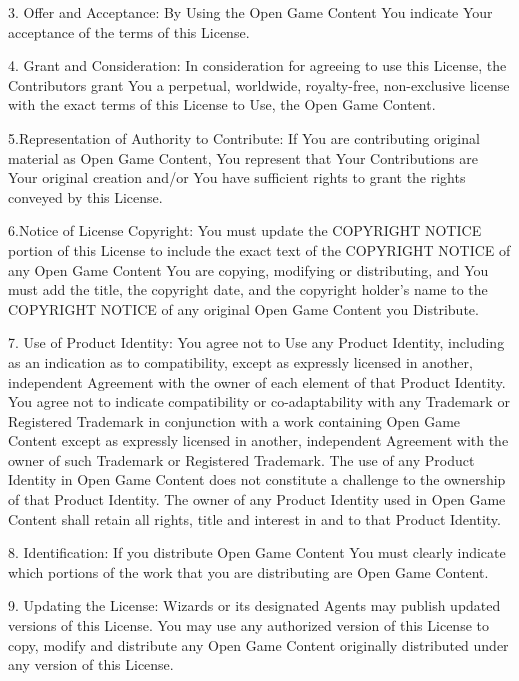 \documentclass[11pt]{article}
\begin{document}
{\bigskip

3. Offer and Acceptance: By Using the Open Game Content You indicate Your acceptance of the terms of this License.

\bigskip

4. Grant and Consideration: In consideration for agreeing to use this License, the Contributors grant You a perpetual, worldwide, royalty-free, non-exclusive license with the exact terms of this License to Use, the Open Game Content.

\bigskip

5.Representation of Authority to Contribute: If You are contributing original material as Open Game Content, You represent that Your Contributions are Your original creation and/or You have sufficient rights to grant the rights conveyed by this License.

\bigskip

6.Notice of License Copyright: You must update the COPYRIGHT NOTICE portion of this License to include the exact text of the COPYRIGHT NOTICE of any Open Game Content You are copying, modifying or distributing, and You must add the title, the copyright date, and the copyright holder's name to the COPYRIGHT NOTICE of any original Open Game Content you Distribute.

\bigskip

7. Use of Product Identity: You agree not to Use any Product Identity, including as an indication as to compatibility, except as expressly licensed in another, independent Agreement with the owner of each element of that Product Identity. You agree not to indicate compatibility or co-adaptability with any Trademark or Registered Trademark in conjunction with a work containing Open Game Content except as expressly licensed in another, independent Agreement with the owner of such Trademark or Registered Trademark. The use of any Product Identity in Open Game Content does not constitute a challenge to the ownership of that Product Identity. The owner of any Product Identity used in Open Game Content shall retain all rights, title and interest in and to that Product Identity.

\bigskip

8. Identification: If you distribute Open Game Content You must clearly indicate which portions of the work that you are distributing are Open Game Content.

\bigskip

9. Updating the License: Wizards or its designated Agents may publish updated versions of this License. You may use any authorized version of this License to copy, modify and distribute any Open Game Content originally distributed under any version of this License.

}
\end{document}
